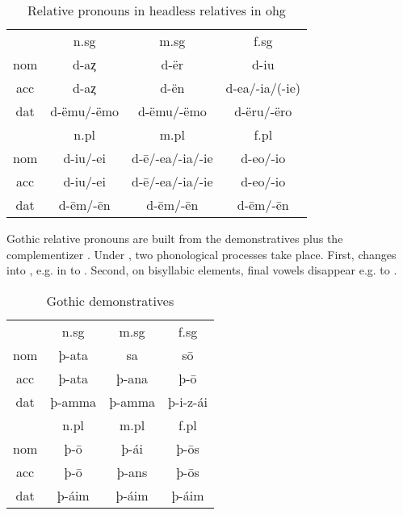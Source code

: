 \begin{table}[H]\label{tbl:paradigmohg}
 \center
 \caption {Relative pronouns in headless relatives in \ac{ohg}}
  \begin{tabular}{cccc}
  \toprule
       & \ac{n}.\ac{sg} & \ac{m}.\ac{sg}  & \ac{f}.\ac{sg} \\
        \cmidrule{2-4}
  \ac{nom} & d-aȥ           & d-ër          & d-iu      \\
  \ac{acc} & d-aȥ        & d-ën      & d-ea/-ia/(-ie) \\
  \ac{dat} & d-ëmu/-ëmo     & d-ëmu/-ëmo   & d-ëru/-ëro   \\
  \bottomrule
         & \ac{n}.\ac{pl} & \ac{m}.\ac{pl}   & \ac{f}.\ac{pl} \\
          \cmidrule{2-4}
    \ac{nom}  & d-iu/-ei      &  d-ē/-ea/-ia/-ie & d-eo/-io        \\
    \ac{acc}  & d-iu/-ei      &  d-ē/-ea/-ia/-ie & d-eo/-io        \\
    \ac{dat}  & d-ēm/-ēn      &  d-ēm/-ēn        & d-ēm/-ēn        \\
    \bottomrule
  \end{tabular}
\end{table}

Gothic relative pronouns are built from the demonstratives plus the complementizer . Under , two phonological processes take place. First,  changes into , e.g. in  to . Second, on bisyllabic elements, final vowels disappear e.g.  to .

\begin{table}[H]
	\center
	\caption {Gothic demonstratives}
		\begin{tabular}{cccc}
		\toprule
							& \ac{n}.\ac{sg} 	& \ac{m}.\ac{sg}	& \ac{f}.\ac{sg}  \\
		 						\cmidrule{2-4}
    \ac{nom} 	& þ-ata 	 			  & sa  			  		& sō		    			\\
    \ac{acc}	& þ-ata    	   		& þ-ana  	  	 		& þ-ō     				\\
    \ac{dat} 	& þ-amma 		   		& þ-amma  				& þ-i-z-ái  			\\
		\bottomrule
    					& \ac{n}.\ac{pl}	& \ac{m}.\ac{pl}	& \ac{f}.\ac{pl}	\\
						    \cmidrule{2-4}
    \ac{nom} 	& þ-ō		     			&	þ-ái   					&	þ-ōs	  				\\
    \ac{acc} 	& þ-ō    					&	þ-ans   				&	þ-ōs	   				\\
    \ac{dat} 	& þ-áim   				&	þ-áim    				&	þ-áim   				\\
    \bottomrule
		\end{tabular}
\end{table}

